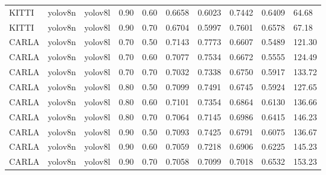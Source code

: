 \begin{tabular}{llllllllll}
KITTI & yolov8n & yolov8l & 0.90 & 0.60 & 0.6658 & 0.6023 & 0.7442 & 0.6409 & 64.68 \\
KITTI & yolov8n & yolov8l & 0.90 & 0.70 & 0.6704 & 0.5997 & 0.7601 & 0.6578 & 67.18 \\
CARLA & yolov8n & yolov8l & 0.70 & 0.50 & 0.7143 & 0.7773 & 0.6607 & 0.5489 & 121.30 \\
CARLA & yolov8n & yolov8l & 0.70 & 0.60 & 0.7077 & 0.7534 & 0.6672 & 0.5555 & 124.49 \\
CARLA & yolov8n & yolov8l & 0.70 & 0.70 & 0.7032 & 0.7338 & 0.6750 & 0.5917 & 133.72 \\
CARLA & yolov8n & yolov8l & 0.80 & 0.50 & 0.7099 & 0.7491 & 0.6745 & 0.5924 & 127.65 \\
CARLA & yolov8n & yolov8l & 0.80 & 0.60 & 0.7101 & 0.7354 & 0.6864 & 0.6130 & 136.66 \\
CARLA & yolov8n & yolov8l & 0.80 & 0.70 & 0.7064 & 0.7145 & 0.6986 & 0.6415 & 146.23 \\
CARLA & yolov8n & yolov8l & 0.90 & 0.50 & 0.7093 & 0.7425 & 0.6791 & 0.6075 & 136.67 \\
CARLA & yolov8n & yolov8l & 0.90 & 0.60 & 0.7059 & 0.7218 & 0.6906 & 0.6225 & 145.23 \\
CARLA & yolov8n & yolov8l & 0.90 & 0.70 & 0.7058 & 0.7099 & 0.7018 & 0.6532 & 153.23 \\
\bottomrule
\end{tabular}
